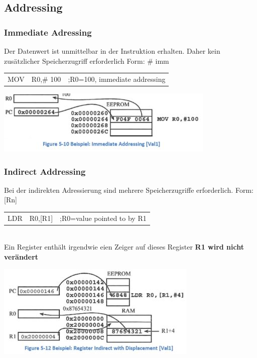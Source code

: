\subsection{Addressing}
\begin{multicols}{2}
    \begin{minipage}{\linewidth}
    \subsubsection{Immediate Adressing}
       Der Datenwert ist unmittelbar in der Instruktion erhalten. Daher kein zusätzlicher Speicherzugriff erforderlich\newline
       Form: \# imm\newline
       \begin{tabular}{lll}
          MOV & R0,\# 100&;R0=100, immediate addressing \\ 
        \end{tabular} 
    \end{minipage}
    \includegraphics[width=0.9\linewidth]{images/immediateAddressing}    
\end{multicols}   


\begin{multicols}{2}
    \begin{minipage}{\linewidth}
    \subsubsection{Indirect Addressing}
        Bei der indirekten Adressierung sind mehrere Speicherzugriffe erforderlich.\newline
        Form: [Rn]\newline
           \begin{tabular}{lll}
              LDR & R0,[R1]&;R0=value pointed to by R1 \\ 
            \end{tabular} \\
        Ein Register enthält irgendwie eien Zeiger auf dieses Register\newline
        \textbf{R1 wird nicht verändert}
     \end{minipage}
     \includegraphics[width=0.9\linewidth]{images/indirectAddressing}    
\end{multicols} 


